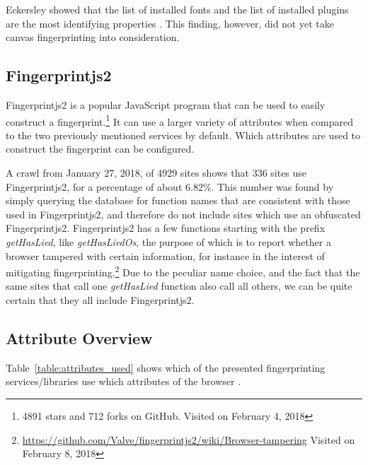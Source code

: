 \documentclass[
    fontsize=12pt,
    headings=small,
    parskip=half,
    bibliography=totoc,
    numbers=noenddot,
    open=any
    ]{scrreprt}
\begin{document}
Eckersley showed that the list of installed fonts and the list of installed plugins are the most identifying properties
\cite{eckersley2010unique}. This finding, however, did not yet take canvas fingerprinting into consideration.


\subsection{Fingerprintjs2}
\label{related_work:fingerprintjs2}
Fingerprintjs2 \cite{fingerprintjs2} is a popular JavaScript program that
can be used to easily construct a fingerprint.\footnote{4891 stars and 712 forks on GitHub. Visited on February 4, 2018}
It can use a larger variety of attributes when compared to the two previously mentioned services by default.
Which attributes are used to construct the fingerprint can be configured.

A crawl from January 27, 2018, of 4929 sites shows that 336 sites use Fingerprintjs2, for a percentage of about 6.82\%.
This number was found by simply querying the database for function names that are consistent with
those used in Fingerprintjs2, and therefore do not include sites which use an obfuscated Fingerprintjs2.
Fingerprintjs2 has a few functions starting with the prefix \textit{getHasLied}, like \textit{getHasLiedOs}, the purpose
of which is to report whether a browser tampered with certain information, for instance in the interest of mitigating
fingerprinting.\footnote{\url{https://github.com/Valve/fingerprintjs2/wiki/Browser-tampering} Visited on February 8, 2018}
Due to the peculiar name choice, and the fact that the same sites that call one \textit{getHasLied}
function also call all others, we can be quite certain that they all include Fingerprintjs2.


\subsection{Attribute Overview}
Table~\ref{table:attributes_used} shows which of the presented fingerprinting services/libraries use which attributes of the
browser \cite{am_i_unique,panopticlick,fingerprintjs2}.
\end{document}
